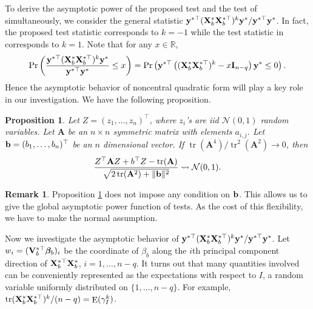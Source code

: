 \documentclass[11pt]{article}
\DeclareMathOperator{\mytr}{tr}
\DeclareMathOperator{\myE}{E}
\newcommand{\By}{\mathbf{y}}    \newcommand{\Bz}{\mathbf{z}}
\newcommand{\BA}{\mathbf{A}}    \newcommand{\BB}{\mathbf{B}}    \newcommand{\BC}{\mathbf{C}}    \newcommand{\BD}{\mathbf{D}}    \newcommand{\BE}{\mathbf{E}}    \newcommand{\BF}{\mathbf{F}}    \newcommand{\BG}{\mathbf{G}}    \newcommand{\BH}{\mathbf{H}}    \newcommand{\BI}{\mathbf{I}}    \newcommand{\BJ}{\mathbf{J}}    \newcommand{\BK}{\mathbf{K}}    \newcommand{\BL}{\mathbf{L}}
\newcommand{\bfsym}[1]{\ensuremath{\boldsymbol{#1}}}
\def\bbeta{\bfsym \beta}
\theoremstyle{plain}
\newtheorem{proposition}{\quad\quad Proposition}
\theoremstyle{definition}
\newtheorem{remark}{\quad\quad Remark}
\theoremstyle{remark}
\begin{document}
To derive the asymptotic power of the proposed test and the test of \cite{Goeman2006} simultaneously, we consider the general statistic
    ${
\By^{*\top}
    (\BX_b^* \BX_b^{*\top})^{k} 
        \By^*
    }/{\By^{*\top} \By^*}$.
    In fact, the proposed test statistic corresponds to $k=-1$ while the test statistic in \cite{Goeman2006} corresponds to $k=1$.
    Note that for any $x\in \mathbb R$,
    \begin{equation*}
        \Pr\left( 
    \frac{
\By^{*\top}
    (\BX_b^* \BX_b^{*\top})^{k} 
        \By^*
    }{\By^{*\top} \By^*}
    \leq x
        \right)
        =
        \Pr\left( 
\By^{*\top}
\left( 
    (\BX_b^* \BX_b^{*\top})^{k} 
    -x\BI_{n-q}
\right)
        \By^*
    \leq 
    0
\right).
    \end{equation*}
Hence the asymptotic behavior of noncentral quadratic form will play a key role in our investigation.
We have the following proposition.
\begin{proposition}
    Let $Z=(z_1,\ldots, z_n)^\top$, where $z_i$'s are iid $\mathcal N(0,1)$ random variables.
    Let $\BA$ be an $n\times n$ symmetric matrix with elements $a_{i,j}$.
    Let $\mathbf{b}=(b_1,\ldots, b_n)^\top$ be an $n$ dimensional vector.
    If $\mytr(\BA^4)/\mytr^2(\BA^2)\to 0$,
    then
    \begin{equation*}
        \frac{Z^\top \BA Z + b^\top Z - \mytr(\BA)}{\sqrt{2\mytr(\BA^2)+\|\Bb\|^2}}
        \rightsquigarrow \mathcal N(0,1).
    \end{equation*}
    \label{Lemma:normal}
\end{proposition}
\begin{remark}
    Proposition \ref{Lemma:normal} does not impose any condition on $\mathbf{b}$.
    This allows us to give the global asymptotic power function of tests.
    As the cost of this flexibility, we have to make the normal assumption.
\end{remark}


Now we investigate the asymptotic behavior of
    ${
\By^{*\top}
    (\BX_b^* \BX_b^{*\top})^{k} 
        \By^*
    }/{\By^{*\top} \By^*}$.
Let $w_i=(\BV_b^{*\top} \bbeta_b)_i$ be the coordinate of $\beta_b$ along the $i$th principal component direction of $\mathbf{X}_b^{*\top} \mathbf{X}_b^*$, $i=1,\ldots, n-q$.
It turns out that many quantities involved can be conveniently represented as the expectations with respect to $I$, a random variable uniformly distributed on $\{1,\ldots, n-q\}$.
For example, $
        {
            \mytr(\BX_b^* \BX_b^{*\top})^k
        }/
        (n-q )
        =\myE (\gamma_I^k)
$.
\end{document}
